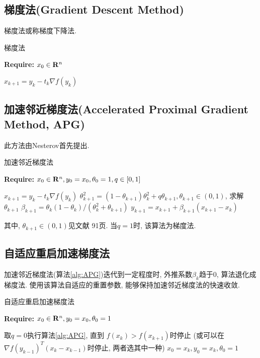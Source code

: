 \documentclass[a4paper,11pt,oneside]{book}
\begin{document}
\subsection{梯度法(Gradient Descent Method)}

梯度法或称梯度下降法.

\begin{algorithm}
\caption{梯度法}
\label{alg:APG}
{\bf Require:} $x_0\in {\bf R}^n$
\begin{algorithmic}[1]
	\State $x_{k+1}=y_k-t_k\nabla f(y_k)$
\EndFor
\end{algorithmic}
\end{algorithm}

\subsection{加速邻近梯度法(Accelerated Proximal Gradient Method, APG)}

此方法由Nesterov\cite{nesterov1983method}首先提出.

\begin{algorithm}
\caption{加速邻近梯度法\cite{nesterov1983method,nesterov1998introductory}}
\label{alg:APG}
{\bf Require:} $x_0\in {\bf R}^n, y_0=x_0, \theta_0=1, q\in[0,1]$
\begin{algorithmic}[1]
	\State $x_{k+1}=y_k-t_k\nabla f(y_k)$
	\State $\theta_{k+1}^2=(1-\theta_{k+1})\theta_k^2+q\theta_{k+1}, \theta_{k+1}\in (0,1)$, 求解 $\theta_{k+1}$
	\State $\beta_{k+1}=\theta_k(1-\theta_k)/(\theta_k^2+\theta_{k+1})$
	\State $y_{k+1}=x_{k+1}+\beta_{k+1}(x_{k+1}-x_k)$
\EndFor
\end{algorithmic}
\end{algorithm}
其中, $\theta_{k+1}\in (0,1)$见文献\cite{nesterov1998introductory} 91页. 当$q=1$时, 该算法为梯度法.

\subsection{自适应重启加速梯度法}

加速邻近梯度法(算法\ref{alg:APG})迭代到一定程度时, 外推系数$\beta_k$趋于0, 算法退化成梯度法. 使用该算法自适应的重置参数, 能够保持加速邻近梯度法的快速收敛.

\begin{algorithm}
\caption{自适应重启加速梯度法\cite{o2015adaptive}}
{\bf Require:} $x_0\in {\bf R}^n, y_0=x_0, \theta_0=1$
\begin{algorithmic}[1]
	\State 取$q=0$执行算法\ref{alg:APG}, 直到 $f(x_k)>f(x_{k+1})$时停止 (或可以在 $\nabla f(y_{k-1})^T(x_k-x_{k-1})$时停止, 两者选其中一种)
	\State $x_0=x_k, y_0=x_k, \theta_0=1$
\EndFor
\end{algorithmic}
\end{algorithm}
\end{document}
